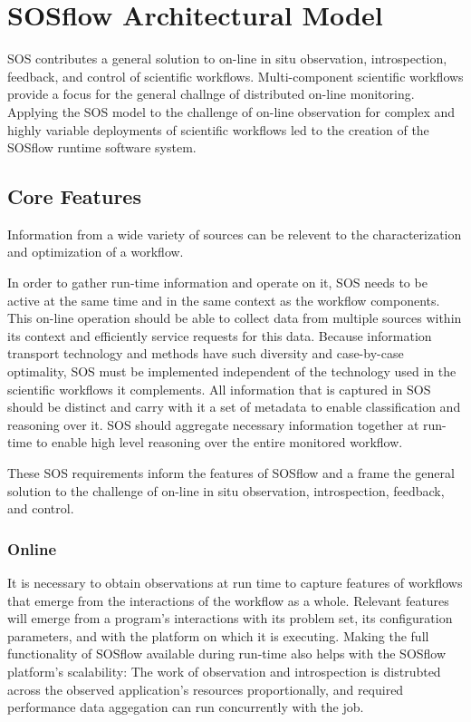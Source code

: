 
\section{SOSflow Architectural Model}
%
SOS contributes a general solution to on-line in situ
observation, introspection, feedback, and control of scientific
workflows.
%
Multi-component scientific workflows provide a focus for the
general challnge of distributed on-line monitoring.
%
Applying the SOS model to the challenge of on-line observation for
complex and highly variable deployments of scientific workflows led to
the creation of the SOSflow runtime software system.
%
\subsection{Core Features}
%
Information from a wide variety of sources can be relevent to the
characterization and optimization of a workflow.
%
\par
%
In order to gather run-time information and operate on it, SOS needs
to be active at the same time and in the same context as the workflow
components.
%
This on-line operation should be able to collect data from multiple
sources within its context and efficiently service requests
for this data.
%
Because information transport technology and methods have such
diversity and case-by-case optimality, SOS must be implemented
independent of the technology used in the scientific workflows it
complements.
%
All information that is captured in SOS should be distinct and carry
with it a set of metadata to enable classification and reasoning over
it.
%
SOS should aggregate necessary information together at run-time to
enable high level reasoning over the entire monitored workflow.
%
\par
%
These SOS requirements inform the features of SOSflow and a frame the
general solution to the challenge of on-line in situ observation,
introspection, feedback, and control.
%
\subsubsection{Online}
%
It is necessary to obtain observations at run time to capture features
of workflows that emerge from the interactions of the workflow as a
whole.
%
Relevant features will emerge from a program's interactions
with its problem set, its configuration parameters, and with the platform on
which it is executing.
%
Making the full functionality of SOSflow available during run-time
also helps with the SOSflow platform's scalability: The work of
observation and introspection is distrubted across the observed
application's resources proportionally, and required performance data
aggegation can run concurrently with the job.
%
